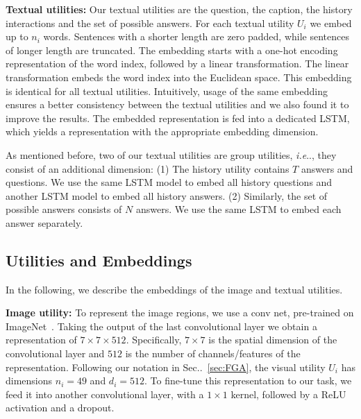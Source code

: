 \documentclass[10pt,twocolumn,letterpaper]{article}
\makeatletter
\newcommand{\alex}[1]{{\color{green}{Alex: #1}}}
\def\@onedot{\ifx\@let@token.\else.\null\fi\xspace}
\DeclareRobustCommand\onedot{\futurelet\@let@token\@onedot}
\newcommand{\secref}[1]{Sec\onedot~\ref{#1}}
\def\ie{\emph{i.e}\onedot} \def\Ie{\emph{I.e}\onedot}
\makeatother
\begin{document}
\noindent\textbf{Textual utilities:} 
Our textual utilities are the question, the caption, the history interactions and the set of possible answers. For each textual utility $ U_i $ we embed up to $n_{i}$ words. Sentences with a shorter length are zero padded, while sentences of longer length are truncated. The embedding starts with a one-hot encoding representation of the word index, followed by a linear transformation. The linear transformation embeds the word index into the Euclidean space. This embedding is identical for all  textual utilities. Intuitively, usage of the same embedding ensures a better consistency between the textual utilities and we also found it to improve the results. The embedded representation is fed into a dedicated LSTM, which yields a representation with the appropriate embedding dimension. 

As mentioned before, two of our textual utilities are group utilities, \ie, they consist of an additional dimension: (1) The history utility contains $ T $ answers and questions. We use the same LSTM model to embed all history questions and another LSTM model to embed all history answers. (2) Similarly, the set of possible answers consists of $ N $ answers. We use the same LSTM to embed each answer separately.   \alex{should we mention this second case when discussing group utilities in Sec. 3?}

\fi


 







	\subsection{Utilities and Embeddings}
	\label{sec:modals}
	
	 In the following, we describe the embeddings of the image and textual utilities. 
	
	\noindent\textbf{Image utility:} 
	To represent the image regions, we use a  conv net,  pre-trained on ImageNet~\cite{imagenet_cvpr09}. Taking the output of the last convolutional layer we obtain a representation  of $7 \times 7 \times 512$. Specifically, $7\times 7$ is the spatial dimension of the convolutional layer and $512$ is the number of channels/features of the representation. Following our notation in  \secref{sec:FGA}, the visual utility $U_i$ has  dimensions $n_i = 49$ and $d_i = 512$. To fine-tune this representation to our task, we feed it into another convolutional layer, with a $1\times 1$ kernel, followed by a ReLU activation and a dropout.  
\end{document}
